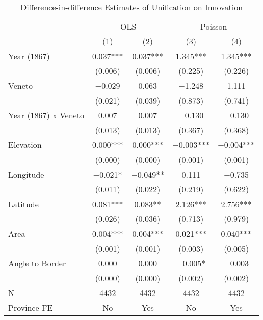 \begin{table}[!h]

\caption{\label{tab:did_analysis_number}Difference-in-difference Estimates of Unification on Innovation}
\centering
\fontsize{9}{11}\selectfont
\begin{threeparttable}
\begin{tabular}[t]{lcccc}
\toprule
\multicolumn{1}{c}{ } & \multicolumn{2}{c}{OLS} & \multicolumn{2}{c}{Poisson} \\
\cmidrule(l{3pt}r{3pt}){2-3} \cmidrule(l{3pt}r{3pt}){4-5}
  & (1) & (2) & (3) & (4)\\
\midrule
Year (1867) & \num{0.037}*** & \num{0.037}*** & \num{1.345}*** & \num{1.345}***\\
 & (\num{0.006}) & (\num{0.006}) & (\num{0.225}) & (\num{0.226})\\
Veneto & \num{-0.029} & \num{0.063} & \num{-1.248} & \num{1.111}\\
 & (\num{0.021}) & (\num{0.039}) & (\num{0.873}) & (\num{0.741})\\
Year (1867) x Veneto & \num{0.007} & \num{0.007} & \num{-0.130} & \num{-0.130}\\
 & (\num{0.013}) & (\num{0.013}) & (\num{0.367}) & (\num{0.368})\\
Elevation & \num{0.000}*** & \num{0.000}*** & \num{-0.003}*** & \num{-0.004}***\\
 & (\num{0.000}) & (\num{0.000}) & (\num{0.001}) & (\num{0.001})\\
Longitude & \num{-0.021}* & \num{-0.049}** & \num{0.111} & \num{-0.735}\\
 & (\num{0.011}) & (\num{0.022}) & (\num{0.219}) & (\num{0.622})\\
Latitude & \num{0.081}*** & \num{0.083}** & \num{2.126}*** & \num{2.756}***\\
 & (\num{0.026}) & (\num{0.036}) & (\num{0.713}) & (\num{0.979})\\
Area & \num{0.004}*** & \num{0.004}*** & \num{0.021}*** & \num{0.040}***\\
 & (\num{0.001}) & (\num{0.001}) & (\num{0.003}) & (\num{0.005})\\
Angle to Border & \num{0.000} & \num{0.000} & \num{-0.005}* & \num{-0.003}\\
 & (\num{0.000}) & (\num{0.000}) & (\num{0.002}) & (\num{0.002})\\
\midrule
N & \num{4432} & \num{4432} & \num{4432} & \num{4432}\\
Province FE & No & Yes & No & Yes\\

\end{tabular}
\end{threeparttable}
\end{table}
